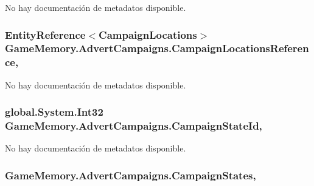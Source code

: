 No hay documentación de metadatos disponible. 

\hypertarget{class_game_memory_1_1_advert_campaigns_a1fbf3e6ceb5391084f9510ca735847de}{
\subsubsection[{Campaign\-Locations\-Reference}]{\setlength{\rightskip}{0pt plus 5cm}Entity\-Reference$<${\bf Campaign\-Locations}$>$ Game\-Memory.\-Advert\-Campaigns.\-Campaign\-Locations\-Reference\hspace{0.3cm}{\ttfamily [get]}, {\ttfamily [set]}}}\label{class_game_memory_1_1_advert_campaigns_a1fbf3e6ceb5391084f9510ca735847de}


No hay documentación de metadatos disponible. 

\hypertarget{class_game_memory_1_1_advert_campaigns_aaeb4c0190abc0c16f835d17371cb8449}{
\subsubsection[{Campaign\-State\-Id}]{\setlength{\rightskip}{0pt plus 5cm}global.\-System.\-Int32 Game\-Memory.\-Advert\-Campaigns.\-Campaign\-State\-Id\hspace{0.3cm}{\ttfamily [get]}, {\ttfamily [set]}}}\label{class_game_memory_1_1_advert_campaigns_aaeb4c0190abc0c16f835d17371cb8449}


No hay documentación de metadatos disponible. 

\hypertarget{class_game_memory_1_1_advert_campaigns_ab254e90abef7201a8b4a9cb314df6e1b}{
\subsubsection[{Campaign\-States}]{ Game\-Memory.\-Advert\-Campaigns.\-Campaign\-States\hspace{0.3cm}{\ttfamily [get]}, {\ttfamily [set]}}}\label{class_game_memory_1_1_advert_campaigns_ab254e90abef7201a8b4a9cb314df6e1b}


